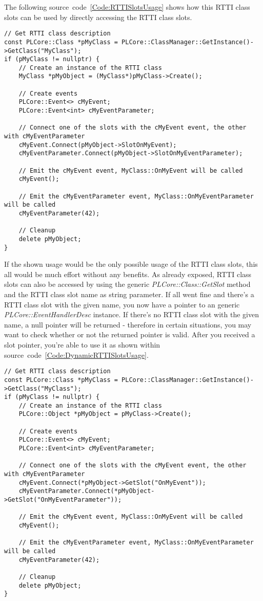 The following source~code~\ref{Code:RTTISlotsUsage} shows how this RTTI class slots can be used by directly accessing the RTTI class slots.
\begin{lstlisting}[label=Code:RTTISlotsUsage,caption={RTTI class slots usage}]
// Get RTTI class description
const PLCore::Class *pMyClass = PLCore::ClassManager::GetInstance()->GetClass("MyClass");
if (pMyClass != nullptr) {
	// Create an instance of the RTTI class
	MyClass *pMyObject = (MyClass*)pMyClass->Create();

	// Create events
	PLCore::Event<> cMyEvent;
	PLCore::Event<int> cMyEventParameter;

	// Connect one of the slots with the cMyEvent event, the other with cMyEventParameter
	cMyEvent.Connect(pMyObject->SlotOnMyEvent);
	cMyEventParameter.Connect(pMyObject->SlotOnMyEventParameter);

	// Emit the cMyEvent event, MyClass::OnMyEvent will be called
	cMyEvent();

	// Emit the cMyEventParameter event, MyClass::OnMyEventParameter will be called
	cMyEventParameter(42);

	// Cleanup
	delete pMyObject;
}
\end{lstlisting}
If the shown usage would be the only possible usage of the RTTI class slots, this all would be much effort without any benefits. As already exposed, RTTI class slots can also be accessed by using the generic \emph{PLCore::Class::GetSlot} method and the RTTI class slot name as string parameter. If all went fine and there's a RTTI class slot with the given name, you now have a pointer to an generic \emph{PLCore::EventHandlerDesc} instance. If there's no RTTI class slot with the given name, a null pointer will be returned - therefore in certain situations, you may want to check whether or not the returned pointer is valid. After you received a slot pointer, you're able to use it as shown within source~code~\ref{Code:DynamicRTTISlotsUsage}.
\begin{lstlisting}[label=Code:DynamicRTTISlotsUsage,caption={Dynamic RTTI class slots usage}]
// Get RTTI class description
const PLCore::Class *pMyClass = PLCore::ClassManager::GetInstance()->GetClass("MyClass");
if (pMyClass != nullptr) {
	// Create an instance of the RTTI class
	PLCore::Object *pMyObject = pMyClass->Create();

	// Create events
	PLCore::Event<> cMyEvent;
	PLCore::Event<int> cMyEventParameter;

	// Connect one of the slots with the cMyEvent event, the other with cMyEventParameter
	cMyEvent.Connect(*pMyObject->GetSlot("OnMyEvent"));
	cMyEventParameter.Connect(*pMyObject->GetSlot("OnMyEventParameter"));

	// Emit the cMyEvent event, MyClass::OnMyEvent will be called
	cMyEvent();

	// Emit the cMyEventParameter event, MyClass::OnMyEventParameter will be called
	cMyEventParameter(42);

	// Cleanup
	delete pMyObject;
}
\end{lstlisting}
